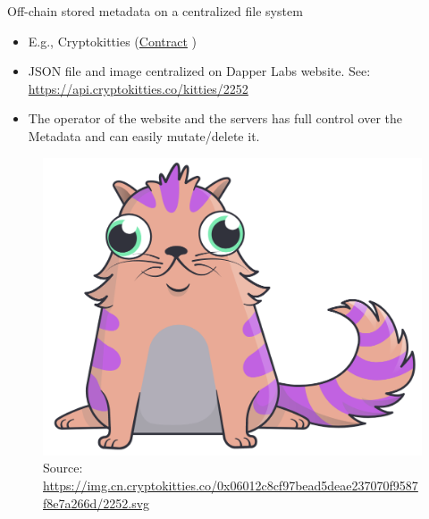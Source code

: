 \documentclass[handout]{beamer}
\begin{document}
\begin{frame}{Off-chain stored metadata on a centralized file system}
\begin{itemize}
	\item E.g., Cryptokitties (\href{https://etherscan.io/address/0x06012c8cf97bead5deae237070f9587f8e7a266d}{Contract} \link)
	\item JSON file and image centralized on Dapper Labs website. See: \link \href{https://api.cryptokitties.co/kitties/2252}{https://api.cryptokitties.co/kitties/2252}
	\item The operator of the website and the servers has full control over the Metadata and can easily mutate/delete it.
\end{itemize}
\vspace{1em}
\begin{figure}
	\centering
	\includegraphics[scale=0.2]{../assets/images/cryptokitty.png}
	\caption*{Source: \link \href{https://img.cn.cryptokitties.co/0x06012c8cf97bead5deae237070f9587f8e7a266d/2252.svg} {\tiny https://img.cn.cryptokitties.co/0x06012c8cf97bead5deae237070f9587f8e7a266d/2252.svg}	}
\end{figure}
\end{frame}
\end{document}
